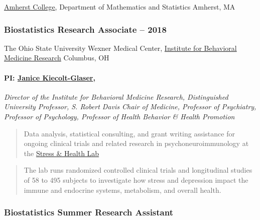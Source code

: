 \documentclass[
  fleqn, oneside]{article}
\begin{document}
\href{amherst.edu}{Amherst College}, Department of Mathematics and
Statistics \newline Amherst, MA

\hypertarget{biostatistics-research-associate-2015-2018}{%
\subsubsection{\texorpdfstring{Biostatistics Research Associate
\hfill{} --
2018}{Biostatistics Research Associate 2015 -- 2018}}\label{biostatistics-research-associate-2015-2018}}

The Ohio State University Wexner Medical Center,
\href{https://wexnermedical.osu.edu/neurological-institute/departments-and-centers/research-centers/institute-for-behavioral-medicine-research/our-team}{Institute
for Behavioral Medicine Research} \newline Columbus, OH

\hypertarget{pi-janice-kiecolt-glaser}{%
\paragraph{\texorpdfstring{PI:
\href{https://wexnermedical.osu.edu/neurological-institute/researchers/janice-kiecolt-glaser-phd}{Janice
Kiecolt-Glaser},}{PI: Janice Kiecolt-Glaser,}}\label{pi-janice-kiecolt-glaser}}

\emph{Director of the Institute for Behavioral Medicine Research,
Distinguished University Professor, S. Robert Davis Chair of Medicine,
Professor of Psychiatry, Professor of Psychology, Professor of Health
Behavior \& Health Promotion}

\begin{quote}
Data analysis, statistical consulting, and grant writing assistance for
ongoing clinical trials and related research in psychoneuroimmunology at
the \href{stressandhealth.org}{Stress \& Health Lab}
\end{quote}

\begin{quote}
The lab runs randomized controlled clinical trials and longitudinal
studies of 58 to 495 subjects to investigate how stress and depression
impact the immune and endocrine systems, metabolism, and overall health.
\end{quote}

\clearpage
\restoregeometry

\hypertarget{biostatistics-summer-research-assistant-2014}{%
\subsubsection{\texorpdfstring{Biostatistics Summer Research Assistant
\hfill{}}{Biostatistics Summer Research Assistant 2014}}\label{biostatistics-summer-research-assistant-2014}}
\end{document}
